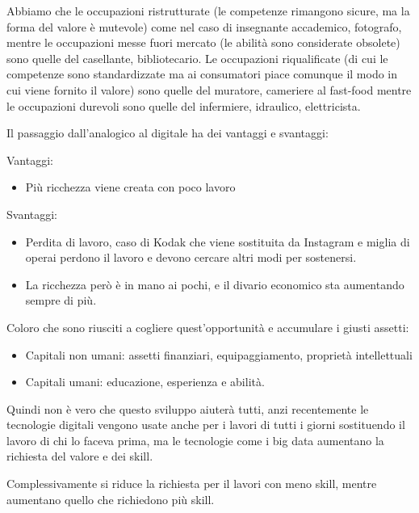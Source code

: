 \documentclass[a4page, 11pt]{article}
\begin{document}
Abbiamo che le occupazioni ristrutturate (le competenze rimangono
sicure, ma la forma del valore è mutevole) come nel caso di insegnante
accademico, fotografo, mentre le occupazioni messe fuori mercato (le
abilità sono considerate obsolete) sono quelle del casellante,
bibliotecario. Le occupazioni riqualificate (di cui le competenze sono
standardizzate ma ai consumatori piace comunque il modo in cui viene
fornito il valore) sono quelle del muratore, cameriere al fast-food
mentre le occupazioni durevoli sono quelle del infermiere, idraulico,
elettricista.

Il passaggio dall'analogico al digitale ha dei vantaggi e svantaggi:

Vantaggi:

\begin{itemize}
	 
	\item
	Più ricchezza viene creata con poco lavoro
\end{itemize}

Svantaggi:

\begin{itemize}
	 
	\item
	Perdita di lavoro, caso di Kodak che viene sostituita da Instagram e
	miglia di operai perdono il lavoro e devono cercare altri modi per
	sostenersi.
	\item
	La ricchezza però è in mano ai pochi, e il divario economico sta
	aumentando sempre di più.
\end{itemize}

Coloro che sono riusciti a cogliere quest'opportunità e accumulare i
giusti assetti:

\begin{itemize}
	 
	\item
	Capitali non umani: assetti finanziari, equipaggiamento, proprietà
	intellettuali
	\item
	Capitali umani: educazione, esperienza e abilità.
\end{itemize}

Quindi non è vero che questo sviluppo aiuterà tutti, anzi recentemente
le tecnologie digitali vengono usate anche per i lavori di tutti i
giorni sostituendo il lavoro di chi lo faceva prima, ma le tecnologie
come i big data aumentano la richiesta del valore e dei skill.

Complessivamente si riduce la richiesta per il lavori con meno skill,
mentre aumentano quello che richiedono più skill.
\end{document}
